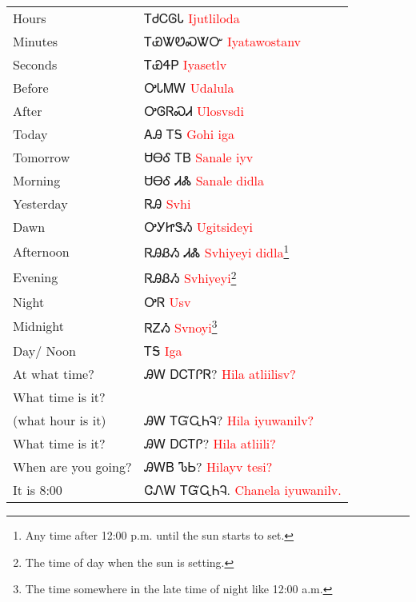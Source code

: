 \begin{minipage}{\linewidth}
\begin{tabular}{p{3cm} p{11cm}}
Hours & ᎢᏧᏟᎶᏓ 
 \newline \textcolor{red}{Ijutliloda}\\
Minutes & ᎢᏯᏔᏬᏍᏔᏅ 
 \newline \textcolor{red}{Iyatawostanv}\\
Seconds & ᎢᏯᏎᏢ 
 \newline \textcolor{red}{Iyasetlv}\\
Before & ᎤᏓᎷᎳ 
 \newline \textcolor{red}{Udalula}\\
After & ᎤᎶᏒᏍᏗ 
 \newline \textcolor{red}{Ulosvsdi}\\
Today & ᎪᎯ ᎢᎦ 
 \newline \textcolor{red}{Gohi iga}\\
Tomorrow & ᏌᎾᎴ ᎢᏴ 
 \newline \textcolor{red}{Sanale iyv}\\
Morning & ᏌᎾᎴ ᏗᏜ 
 \newline \textcolor{red}{Sanale didla}\\
Yesterday & ᏒᎯ 
 \newline \textcolor{red}{Svhi}\\
Dawn & ᎤᎩᏥᏕᏱ 
 \newline \textcolor{red}{Ugitsideyi}\\
Afternoon & ᏒᎯᏰᏱ ᏗᏜ 
 \newline \textcolor{red}{Svhiyeyi didla}\footnote{Any time after 12:00 p.m. until the sun starts to set.}\\
Evening & ᏒᎯᏰᏱ 
 \newline \textcolor{red}{Svhiyeyi}\footnote{The time of day when the sun is setting.}\\
Night & ᎤᏒ 
 \newline \textcolor{red}{Usv}\\
Midnight & ᏒᏃᏱ 
 \newline \textcolor{red}{Svnoyi}\footnote{The time somewhere in the late time of night like 12:00 a.m.}\\
Day/ Noon & ᎢᎦ 
 \newline \textcolor{red}{Iga}\\
At what time? & ᎯᎳ ᎠᏟᎢᎵᏒ? 
 \newline \textcolor{red}{Hila atliilisv?}\\
What time is it?\\ (what hour is it) & ᎯᎳ ᎢᏳᏩᏂᎸ? 
 \newline \textcolor{red}{Hila iyuwanilv?}\\
What time is it? & ᎯᎳ ᎠᏟᎢᎵ? 
 \newline \textcolor{red}{Hila atliili?}\\
When are you going? & ᎯᎳᏴ ᏖᏏ? 
 \newline \textcolor{red}{Hilayv tesi?}\\
It is 8:00 & ᏣᏁᎳ ᎢᏳᏩᏂᎸ. 
 \newline \textcolor{red}{Chanela iyuwanilv.}\\
\end{tabular}
\end{minipage}

